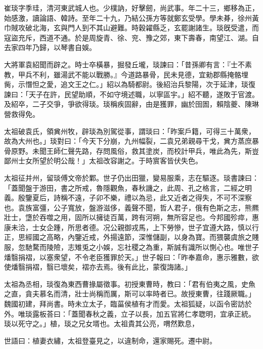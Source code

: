 
\begin{pinyinscope}
崔琰字季珪，清河東武城人也。少樸訥，好擊劒，尚武事。年二十三，鄉移為正，始感激，讀論語、韓詩。至年二十九，乃結公孫方等就鄭玄受學。學未朞，徐州黃巾賊攻破北海，玄與門人到不其山避難。時穀糴縣乏，玄罷謝諸生。琰旣受遣，而寇盜充斥，西道不通。於是周旋青、徐、兖、豫之郊，東下壽春，南望江、湖。自去家四年乃歸，以琴書自娛。

大將軍袁紹聞而辟之。時士卒橫暴，掘發丘壠，琰諫曰：「昔孫卿有言：『士不素教，甲兵不利，雖湯武不能以戰勝。』今道路暴骨，民未見德，宜勑郡縣掩骼埋胔，示憯怛之愛，追文王之仁。」紹以為騎都尉。後紹治兵黎陽，次于延津，琰復諫曰：「天子在許，民望助順，不如守境述職，以寧區宇。」紹不聽，遂敗于官渡。及紹卒，二子交爭，爭欲得琰。琰稱疾固辭，由是獲罪，幽於囹圄，賴陰夔、陳琳營救得免。

太祖破袁氏，領兾州牧，辟琰為別駕從事，謂琰曰：「昨案戶籍，可得三十萬衆，故為大州也。」琰對曰：「今天下分崩，九州幅裂，二袁兄弟親尋干戈，兾方蒸庶暴骨原野。未聞王師仁聲先路，存問風俗，救其塗炭，而校計甲兵，唯此為先，斯豈鄙州士女所望於明公哉！」太祖改容謝之。于時賔客皆伏失色。

太祖征并州，留琰傅文帝於鄴。世子仍出田獵，變易服乘，志在驅逐。琰書諫曰：「蓋聞盤于游田，書之所戒，魯隱觀魚，春秋譏之，此周、孔之格言，二經之明義。殷鑒夏后，詩稱不遠，子卯不樂，禮以為忌，此又近者之得失，不可不深察也。袁族富彊，公子寬放，盤游滋侈，義聲不聞，哲人君子，俄有色斯之志，熊羆壯士，墯於吞噬之用，固所以擁徒百萬，跨有河朔，無所容足也。今邦國殄瘁，惠康未洽，士女企踵，所思者德。况公親御戎馬，上下勞慘，世子宜遵大路，慎以行正，思經國之高略，內鑒近戒，外揚遠節，深惟儲副，以身為寶。而猥襲虞旅之賤服，忽馳騖而陵險，志雉兎之小娛，忘社稷之為重，斯誠有識所以惻心也。唯世子燔翳捐褶，以塞衆望，不令老臣獲罪於天。」世子報曰：「昨奉嘉命，惠示雅數，欲使燔翳捐褶，翳已壞矣，褶亦去焉。後有此比，蒙復誨諸。」

太祖為丞相，琰復為東西曹掾屬徵事。初授東曹時，教曰：「君有伯夷之風，史魚之直，貪夫慕名而清，壯士尚稱而厲，斯可以率時者已。故授東曹，往踐厥職。」魏國初建，拜尚書。時未立太子，臨菑侯植有才而愛。太祖狐疑，以函令密訪於外。唯琰露板荅曰：「蓋聞春秋之義，立子以長，加五官將仁孝聦明，宜承正統。琰以死守之。」植，琰之兄女壻也。太祖貴其公亮，喟然歎息，

世語曰：植妻衣繡，太祖登臺見之，以違制命，還家賜死。遷中尉。


\end{pinyinscope}
